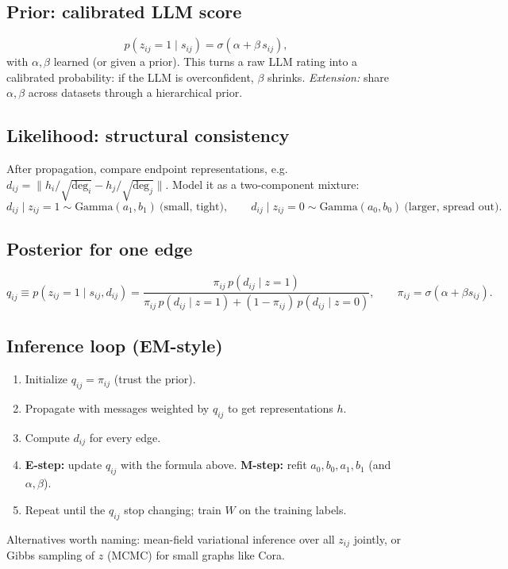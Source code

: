 \documentclass[11pt]{article}
\begin{document}
\subsection{Prior: calibrated LLM score}
\[
p(z_{ij}=1 \mid s_{ij}) = \sigma(\alpha + \beta\, s_{ij}),
\]
with $\alpha,\beta$ learned (or given a prior). This turns a raw LLM rating into a calibrated
probability: if the LLM is overconfident, $\beta$ shrinks.
\emph{Extension:} share $\alpha,\beta$ across datasets through a hierarchical prior.

\subsection{Likelihood: structural consistency}
After propagation, compare endpoint representations, e.g.
$d_{ij} = \bigl\lVert h_i/\sqrt{\deg_i} - h_j/\sqrt{\deg_j}\bigr\rVert$. Model it as a
two-component mixture:
\[
d_{ij} \mid z_{ij}=1 \sim \text{Gamma}(a_1,b_1)\ \text{(small, tight)},\qquad
d_{ij} \mid z_{ij}=0 \sim \text{Gamma}(a_0,b_0)\ \text{(larger, spread out)}.
\]

\subsection{Posterior for one edge}
\[
q_{ij} \equiv p(z_{ij}=1 \mid s_{ij}, d_{ij}) =
\frac{\pi_{ij}\, p(d_{ij}\mid z=1)}{\pi_{ij}\, p(d_{ij}\mid z=1) + (1-\pi_{ij})\, p(d_{ij}\mid z=0)},
\qquad \pi_{ij} = \sigma(\alpha+\beta s_{ij}).
\]

\subsection{Inference loop (EM-style)}
\begin{enumerate}
  \item Initialize $q_{ij} = \pi_{ij}$ (trust the prior).
  \item Propagate with messages weighted by $q_{ij}$ to get representations $h$.
  \item Compute $d_{ij}$ for every edge.
  \item \textbf{E-step:} update $q_{ij}$ with the formula above.
        \textbf{M-step:} refit $a_0,b_0,a_1,b_1$ (and $\alpha,\beta$).
  \item Repeat until the $q_{ij}$ stop changing; train $W$ on the training labels.
\end{enumerate}
Alternatives worth naming: mean-field variational inference over all $z_{ij}$ jointly, or
Gibbs sampling of $z$ (MCMC) for small graphs like Cora.
\end{document}
